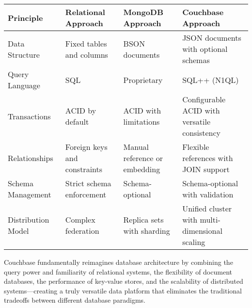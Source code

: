 \begin{tabular}{|>{\centering\arraybackslash}p{3.2cm}|>{\centering\arraybackslash}p{3.5cm}|>{\centering\arraybackslash}p{3.5cm}|>{\centering\arraybackslash}p{4cm}|}
\hline
\textbf{Principle} & \textbf{Relational Approach} & \textbf{MongoDB Approach} & \textbf{Couchbase Approach} \\
\hline
Data Structure & Fixed tables and columns & BSON documents & JSON documents with optional schemas \\
\hline
Query Language & SQL & Proprietary & SQL++ (N1QL) \\
\hline
Transactions & ACID by default & ACID with limitations & Configurable ACID with versatile consistency \\
\hline
Relationships & Foreign keys and constraints & Manual reference or embedding & Flexible references with JOIN support \\
\hline
Schema Management & Strict schema enforcement & Schema-optional & Schema-optional with validation \\
\hline
Distribution Model & Complex federation & Replica sets with sharding & Unified cluster with multi-dimensional scaling \\
\hline
\end{tabular}

Couchbase fundamentally reimagines database architecture by combining the query power and familiarity of relational systems, the flexibility of document databases, the performance of key-value stores, and the scalability of distributed systems—creating a truly versatile data platform that eliminates the traditional tradeoffs between different database paradigms.
